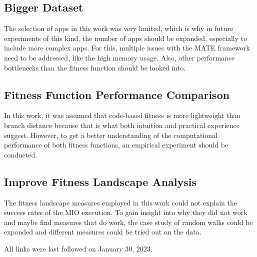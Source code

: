 \documentclass[
  a4paper,  %
  twoside,  %
  bibliography=totoc,
  headsepline,
  cleardoublepage=empty,
  parskip=half,
  draft=false
]{scrbook}
\begin{document}
\subsection*{Bigger Dataset}
The selection of apps in this work was very limited, which is why in future experiments of this kind, the number of apps should be expanded, especially to include more complex apps.
For this, multiple issues with the MATE framework need to be addressed, like the high memory usage.
Also, other performance bottlenecks than the fitness function should be looked into.

\subsection*{Fitness Function Performance Comparison}
In this work, it was assumed that code-based fitness is more lightweight than branch distance because that is what both intuition and practical experience suggest.
However, to get a better understanding of the computational performance of both fitness functions, an empirical experiment should be conducted.

\subsection*{Improve Fitness Landscape Analysis}
The fitness landscape measures employed in this work could not explain the success rates of the MIO execution.
To gain insight into why they did not work and maybe find measures that do work, the case study of random walks could be expanded and different measures could be tried out on the data.


\printbibliography

All links were last followed on January 30, 2023.

\appendix

\pagestyle{empty}
\renewcommand*{\chapterpagestyle}{empty}
\Versicherung
\end{document}

